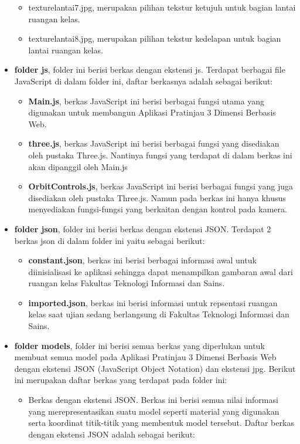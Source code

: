 \begin{itemize}
\begin{itemize}
		\item texturelantai7.jpg, merupakan pilihan tekstur ketujuh untuk bagian lantai ruangan kelas.
		\item texturelantai8.jpg, merupakan pilihan tekstur kedelapan untuk bagian lantai ruangan kelas.
	\end{itemize}
	\item {\bf folder js}, folder ini berisi berkas dengan ekstensi js. Terdapat berbagai file JavaScript di dalam folder ini, daftar berkasnya adalah sebagai berikut:
		\begin{itemize}
			\item {\bf Main.js}, berkas JavaScript ini berisi berbagai fungsi utama yang digunakan untuk membangun Aplikasi Pratinjau 3 Dimensi Berbasis Web.
			\item {\bf three.js}, berkas JavaScript ini berisi berbagai fungsi yang disediakan oleh pustaka Three.js. Nantinya fungsi yang terdapat di dalam berkas ini akan dipanggil oleh Main.js
			\item {\bf OrbitControls.js}, berkas JavaScript ini berisi berbagai fungsi yang juga disediakan oleh pustaka Three.js. Namun pada berkas ini hanya khusus menyediakan fungsi-fungsi yang berkaitan dengan kontrol pada kamera.
		\end{itemize}
	\item {\bf folder json}, folder ini berisi berkas dengan ekstensi JSON. Terdapat 2 berkas json di dalam folder ini yaitu sebagai berikut:
		\begin{itemize}
			\item {\bf constant.json}, berkas ini berisi berbagai informasi awal untuk diinisialisasi ke aplikasi sehingga dapat menampilkan gambaran awal dari ruangan kelas Fakultas Teknologi Informasi dan Sains.
			\item {\bf imported.json}, berkas ini berisi informasi untuk repsentasi ruangan kelas saat ujian sedang berlangsung di Fakultas Teknologi Informasi dan Sains.
		\end{itemize}
	\item {\bf folder models}, folder ini berisi semua berkas yang diperlukan untuk membuat semua model pada Aplikasi Pratinjau 3 Dimensi Berbasis Web dengan ekstensi JSON (JavaScript Object Notation) dan ekstensi jpg. Berikut ini merupakan daftar berkas yang terdapat pada folder ini:
	\begin{itemize}
		\item Berkas dengan ekstensi JSON. Berkas ini berisi semua nilai informasi yang merepresentasikan suatu model seperti material yang digunakan serta koordinat titik-titik yang membentuk model tersebut. Daftar berkas dengan ekstensi JSON adalah sebagai berikut:

\end{itemize}
\end{itemize}
